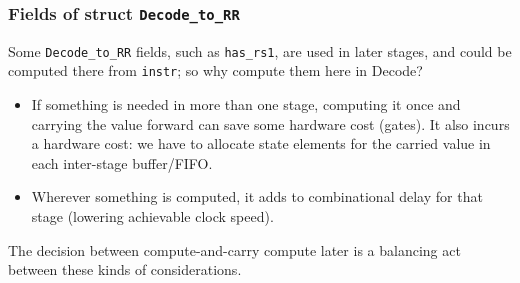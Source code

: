 
\begin{frame}[fragile]
\frametitle{Fields of struct {\tt Decode\_to\_RR}}

\footnotesize

Some {\tt Decode\_to\_RR} fields, such as \verb|has_rs1|, are used in
later stages, and could be computed there from \verb|instr|; so why
compute them here in Decode?

\vspace{4ex}

\begin{itemize}

 \item If something is needed in more than one stage, computing it
       once and carrying the value forward can save some hardware cost
       (gates).  It also incurs a hardware cost: we have to allocate
       state elements for the carried value in each inter-stage
       buffer/FIFO.

 \item Wherever something is computed, it adds to combinational delay
       for that stage (lowering achievable clock speed).

\end{itemize}

\vspace{4ex}

The decision between compute-and-carry {\vs} compute later is a
balancing act between these kinds of considerations.

\end{frame}


